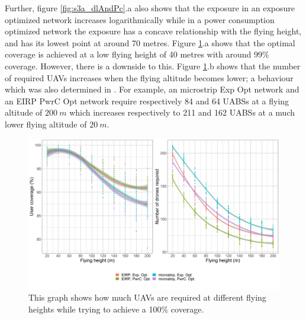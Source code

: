 Further, figure  \ref{fig:s3a_dlAndPc}.a also shows that the exposure in an exposure optimized network increases logarithmically while in a power consumption optimized network the exposure has a concave relationship with the flying height, and has its lowest point at around 70 metres.
Figure \ref{fig:s3a_numDronesAndCov}.a shows that the optimal coverage is achieved at a low flying height of 
40 metres with around 99\% coverage. 
However, there is a downside to this. 
Figure \ref{fig:s3a_numDronesAndCov}.b 
 shows that the number of required \gls{UAV}s increases when the flying altitude becomes lower;
a behaviour which was also determined in \cite{J2}.
For example, an microstrip \gls{Exp Opt} network and an \gls{EIRP} \gls{PwrC Opt} network require respectively 84 and 64
\gls{UABS}s at a flying altitude of $200\ m$ which increases respectively to 211 and 162 \gls{UABS}s at a much lower flying altitude of $20\ m$.
\begin{figure}[h!]
\centering
  \includegraphics[width=\textwidth]{../results/s3/fhvsnumdronesAndCov.png}
  \caption{This graph shows how much \acs{UAV}s are required at different flying heights while trying to achieve a 100\% coverage.}
  \label{fig:s3a_numDronesAndCov}
\end{figure}

